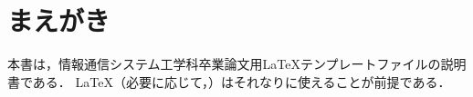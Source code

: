 \chapter{まえがき}
本書は，情報通信システム工学科卒業論文用\LaTeX テンプレートファイルの説明書である．
\LaTeX （必要に応じて，\BibTeX）はそれなりに使えることが前提である．




